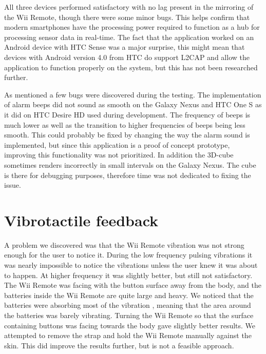 All three devices performed satisfactory with no lag present in the mirroring of the Wii Remote, though there were some minor bugs. This helps confirm that modern smartphones have the processing power required to function as a hub for processing sensor data in real-time. The fact that the application worked on an Android device with HTC Sense was a major surprise, this might mean that devices with Android version 4.0 from HTC do support L2CAP and allow the application to function properly on the system, but this has not been researched further.

As mentioned a few bugs were discovered during the testing. The implementation of alarm beeps did not sound as smooth on the Galaxy Nexus and HTC One S as it did on HTC Desire HD used during development. The frequency of beeps is much lower as well as the transition to higher frequencies of beeps being less smooth. This could probably be fixed by changing the way the alarm sound is implemented, but since this application is a proof of concept prototype, improving this functionality was not prioritized. In addition the 3D-cube sometimes renders incorrectly in small intervals on the Galaxy Nexus. The cube is there  for debugging purposes, therefore time was not dedicated to fixing the issue.

\section{Vibrotactile feedback}
A problem we discovered was that the Wii Remote vibration was not strong enough for the user to notice it. During the low frequency pulsing vibrations it was nearly impossible to notice the vibrations unless the user knew it was about to happen. At higher frequency it was slightly better, but still not satisfactory. The Wii Remote was facing with the button surface away from the body, and the batteries inside the Wii Remote are quite large and heavy. We noticed that the batteries were absorbing most of the vibration , meaning that the area around the batteries was barely vibrating. Turning the Wii Remote so that the surface containing buttons was facing towards the body gave slightly better results. We attempted to remove the strap and hold the Wii Remote manually against the skin. This did improve the results further, but is not a feasible approach.
